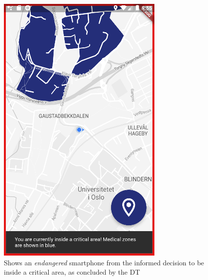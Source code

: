 \documentclass{article}
\begin{document}
\begin{figure}[H]
\begin{minipage}[c]{0.40\linewidth}
        \includegraphics[width=\linewidth]{graphics/endangered_smartphone.png}
        \caption{Shows an \emph{endangered} smartphone from the informed decision to be inside a critical area, as concluded by the DT}
        \label{fig:endangered_smartphone}
    \end{minipage}
\end{figure}
\end{document}
